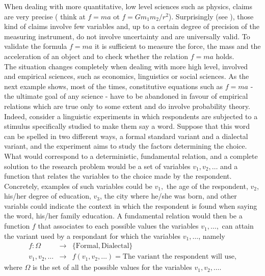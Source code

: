 When dealing with more quantitative, low level sciences such as physics, claims are very precise ( think at $f = ma$ ot $ f = G m_1 m_2/r^2$). Surprisingly (see \cite{wigner}), those kind of claims involve few variables and, up to a certain degree of precision of the measuring instrument, do not involve uncertainty and are universally valid. To validate the formula $f = ma$ it is sufficient to measure the force, the mass and the acceleration of an object and to check whether the relation $f = ma$ holds.\\ 
The situation changes completely when dealing with more high level, involved and empirical sciences, such as economics, linguistics or social sciences. As the next example shows, most of the times, constitutive equations such as $f = ma$ - the ultimate goal of any science - have to be abandoned in favour of empirical relations which are true only to some extent and do involve probability theory. \\
	Indeed, consider a linguistic experiments in which respondents are subjected to a stimulus specifically studied to make them say a word. Suppose that this word can be spelled in two different ways, a formal standard  variant and a dialectal variant, and the experiment aims to study the factors determining the choice.  
What would correspond to a deterministic, fundamental relation, and a complete solution to the research problem would be a set of variables $v_1, v_2, \ldots $ and a function that relates the variables to the choice made by the respondent. Concretely, examples of such variables could be $v_1,$ the age of the respondent, $v_2$, his/her degree of education, $v_3$, the city where he/she was born, and other variabls could indicate the context in which the respondent is found when saying the word, his/her family education. A fundamental relation would then be a function $f$ that associates to each possible values the variables $v_1, \ldots,$ can attain the variant used by a respondant for which the variables $v_1,\ldots$, namely
\begin{equation}
	\label{e:impossible}
	\begin{array}{ccc}
		f: \Omega  & \to  & \{ \text{Formal}, \text{Dialectal}\}	\\	
		v_1,v_2,\ldots & \to & f(v_1,v_2, \ldots) = \text{The variant the respondent will use,}
	\end{array}
\end{equation}
where $\Omega$ is the set of all the possible values for the variables $v_1, v_2, \ldots$.\\
